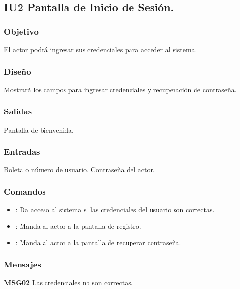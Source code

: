 
\subsection{IU2 Pantalla de Inicio de Sesión.}

\subsubsection{Objetivo}
	El actor podrá ingresar sus credenciales para acceder al sistema.

\subsubsection{Diseño}
	Mostrará los campos para ingresar credenciales y recuperación de contraseña.


\subsubsection{Salidas}

	Pantalla de bienvenida.

\subsubsection{Entradas}

	Boleta o número de usuario.
	Contraseña del actor.

\subsubsection{Comandos}
\begin{itemize}
	\item {}: Da acceso al sistema si las credenciales del usuario son correctas.
	\item {}: Manda al actor a la pantalla de registro.
	\item {}: Manda al actor a la pantalla de recuperar contraseña.
\end{itemize}

\subsubsection{Mensajes}
\begin{Citemize}
	\item {\bf MSG02} Las credenciales no son correctas.
\end{Citemize}

